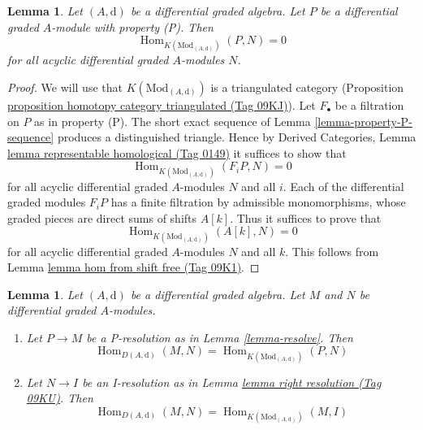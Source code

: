 \documentclass{amsart}
\theoremstyle{plain}
\newtheorem{lemma}[subsection]{Lemma}
\theoremstyle{definition}
\theoremstyle{remark}
\numberwithin{equation}{subsection}
\def\Hom{\mathop{\mathrm{Hom}}\nolimits}
\begin{document}
\begin{lemma}
\label{lemma-property-P-K-projective}
Let $(A, \text{d})$ be a differential graded algebra.
Let $P$ be a differential graded $A$-module with property (P).
Then
$$
\Hom_{K(\text{Mod}_{(A, \text{d})})}(P, N) = 0
$$
for all acyclic differential graded $A$-modules $N$.
\end{lemma}

\begin{proof}
We will use that $K(\text{Mod}_{(A, \text{d})})$ is a triangulated
category (Proposition \href{https://stacks.math.columbia.edu/tag/09KJ}{proposition homotopy category triangulated (Tag 09KJ)}).
Let $F_\bullet$ be a filtration on $P$ as in property (P).
The short exact sequence of Lemma \ref{lemma-property-P-sequence}
produces a distinguished triangle. Hence by
Derived Categories, Lemma \href{https://stacks.math.columbia.edu/tag/0149}{lemma representable homological (Tag 0149)}
it suffices to show that
$$
\Hom_{K(\text{Mod}_{(A, \text{d})})}(F_iP, N) = 0
$$
for all acyclic differential graded $A$-modules $N$ and all $i$.
Each of the differential graded modules $F_iP$ has a finite filtration
by admissible monomorphisms, whose graded pieces are direct sums
of shifts $A[k]$. Thus it suffices to prove that
$$
\Hom_{K(\text{Mod}_{(A, \text{d})})}(A[k], N) = 0
$$
for all acyclic differential graded $A$-modules $N$ and all $k$.
This follows from Lemma \href{https://stacks.math.columbia.edu/tag/09K1}{lemma hom from shift free (Tag 09K1)}.
\end{proof}


\begin{lemma}
\label{lemma-hom-derived}
Let $(A, \text{d})$ be a differential graded algebra.
Let $M$ and $N$ be differential graded $A$-modules.
\begin{enumerate}
\item Let $P \to M$ be a P-resolution as in
Lemma \ref{lemma-resolve}. Then
$$
\Hom_{D(A, \text{d})}(M, N) =
\Hom_{K(\text{Mod}_{(A, \text{d})})}(P, N)
$$
\item Let $N \to I$ be an I-resolution as in
Lemma \href{https://stacks.math.columbia.edu/tag/09KU}{lemma right resolution (Tag 09KU)}. Then
$$
\Hom_{D(A, \text{d})}(M, N) =
\Hom_{K(\text{Mod}_{(A, \text{d})})}(M, I)
$$
\end{enumerate}
\end{lemma}
\end{document}
